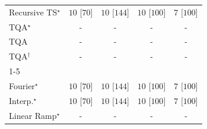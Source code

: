 \begin{tabular}{l|cccc|}
Recursive TS$^\star$ & {\cellcolor[HTML]{00441B}} \color[HTML]{F1F1F1} $10$ [$70$] & {\cellcolor[HTML]{00441B}} \color[HTML]{F1F1F1} $10$ [$144$] & {\cellcolor[HTML]{00441B}} \color[HTML]{F1F1F1} $10$ [$100$] & {\cellcolor[HTML]{37A055}} \color[HTML]{F1F1F1} $7$ [$100$] \\
TQA$^\star$ & {\cellcolor[HTML]{000000}} \color[HTML]{F1F1F1} {\cellcolor{white}} \color{black} - & {\cellcolor[HTML]{000000}} \color[HTML]{F1F1F1} {\cellcolor{white}} \color{black} - & {\cellcolor[HTML]{000000}} \color[HTML]{F1F1F1} {\cellcolor{white}} \color{black} - & {\cellcolor[HTML]{000000}} \color[HTML]{F1F1F1} {\cellcolor{white}} \color{black} - \\
TQA & {\cellcolor[HTML]{000000}} \color[HTML]{F1F1F1} {\cellcolor{white}} \color{black} - & {\cellcolor[HTML]{000000}} \color[HTML]{F1F1F1} {\cellcolor{white}} \color{black} - & {\cellcolor[HTML]{000000}} \color[HTML]{F1F1F1} {\cellcolor{white}} \color{black} - & {\cellcolor[HTML]{000000}} \color[HTML]{F1F1F1} {\cellcolor{white}} \color{black} - \\
TQA$^\dagger$ & {\cellcolor[HTML]{000000}} \color[HTML]{F1F1F1} {\cellcolor{white}} \color{black} - & {\cellcolor[HTML]{000000}} \color[HTML]{F1F1F1} {\cellcolor{white}} \color{black} - & {\cellcolor[HTML]{000000}} \color[HTML]{F1F1F1} {\cellcolor{white}} \color{black} - & {\cellcolor[HTML]{000000}} \color[HTML]{F1F1F1} {\cellcolor{white}} \color{black} - \\
\cline{1-5}
\multicolumn{5}{c}{\rule{0pt}{8pt}PP} \\
\midrule
Fourier$^\star$ & {\cellcolor[HTML]{00441B}} \color[HTML]{F1F1F1} $10$ [$70$] & {\cellcolor[HTML]{00441B}} \color[HTML]{F1F1F1} $10$ [$144$] & {\cellcolor[HTML]{00441B}} \color[HTML]{F1F1F1} $10$ [$100$] & {\cellcolor[HTML]{37A055}} \color[HTML]{F1F1F1} $7$ [$100$] \\
Interp.$^\star$ & {\cellcolor[HTML]{00441B}} \color[HTML]{F1F1F1} $10$ [$70$] & {\cellcolor[HTML]{00441B}} \color[HTML]{F1F1F1} $10$ [$144$] & {\cellcolor[HTML]{00441B}} \color[HTML]{F1F1F1} $10$ [$100$] & {\cellcolor[HTML]{37A055}} \color[HTML]{F1F1F1} $7$ [$100$] \\
Linear Ramp$^\star$ & {\cellcolor[HTML]{000000}} \color[HTML]{F1F1F1} {\cellcolor{white}} \color{black} - & {\cellcolor[HTML]{000000}} \color[HTML]{F1F1F1} {\cellcolor{white}} \color{black} - & {\cellcolor[HTML]{000000}} \color[HTML]{F1F1F1} {\cellcolor{white}} \color{black} - & {\cellcolor[HTML]{000000}} \color[HTML]{F1F1F1} {\cellcolor{white}} \color{black} - \\

\end{tabular}
